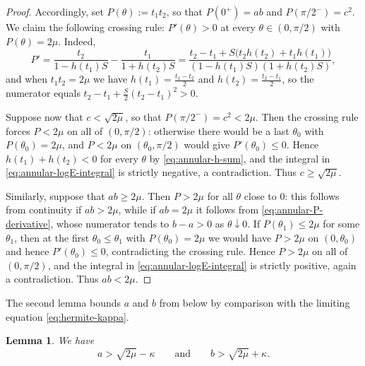 \documentclass[11pt]{article}
\numberwithin{equation}{section}
\newtheorem{lemma}[theorem]{Lemma}
\theoremstyle{definition}
\begin{document}
\begin{proof}
Accordingly, set $P(\theta):=t_1t_2$, so that $P(0^+)=ab$ and $P(\pi/2^-)=c^2$. We claim the following crossing rule: $P'(\theta)>0$ at every $\theta\in(0,\pi/2)$ with $P(\theta)=2\mu$. Indeed,
\begin{equation}\label{eq:annular-P-derivative}
    P'
    =
    \frac{t_2}{1-h(t_1)S}
    -
    \frac{t_1}{1+h(t_2)S}
    =
    \frac{
        t_2-t_1+S\bigl(t_2h(t_2)+t_1h(t_1)\bigr)
    }{
        (1-h(t_1)S)(1+h(t_2)S)
    },
\end{equation}
and when $t_1t_2=2\mu$ we have $h(t_1)=\frac{t_1-t_2}2$ and $h(t_2)=\frac{t_2-t_1}2$, so the numerator equals $t_2-t_1+\frac S2(t_2-t_1)^2>0$.


Suppose now that $c<\sqrt{2\mu}$, so that $P(\pi/2^-)=c^2<2\mu$. Then the crossing rule forces $P<2\mu$ on all of $(0,\pi/2)$: otherwise there would be a last $\theta_0$ with $P(\theta_0)=2\mu$, and $P<2\mu$ on $(\theta_0,\pi/2)$ would give $P'(\theta_0)\leq0$. Hence $h(t_1)+h(t_2)<0$ for every $\theta$ by \eqref{eq:annular-h-sum}, and the integral in \eqref{eq:annular-logE-integral} is strictly negative, a contradiction. Thus $c\geq\sqrt{2\mu}$.

Similarly, suppose that $ab\geq2\mu$. Then $P>2\mu$ for all $\theta$ close to $0$: this follows from continuity if $ab>2\mu$, while if $ab=2\mu$ it follows from \eqref{eq:annular-P-derivative}, whose numerator tends to $b-a>0$ as $\theta\downarrow0$. If $P(\theta_1)\leq2\mu$ for some $\theta_1$, then at the first $\theta_0\leq\theta_1$ with $P(\theta_0)=2\mu$ we would have $P>2\mu$ on $(0,\theta_0)$ and hence $P'(\theta_0)\leq0$, contradicting the crossing rule. Hence $P>2\mu$ on all of $(0,\pi/2)$, and the integral in \eqref{eq:annular-logE-integral} is strictly positive, again a contradiction. Thus $ab<2\mu$.
\end{proof}


The second lemma bounds $a$ and $b$ from below by comparison with the limiting equation \eqref{eq:hermite-kappa}.

\begin{lemma}\label{lem:annular-barrier}
We have
\[
    a>\sqrt{2\mu}-\kappa
    \qquad\text{and}\qquad
    b>\sqrt{2\mu}+\kappa.
\]
\end{lemma}
\end{document}

